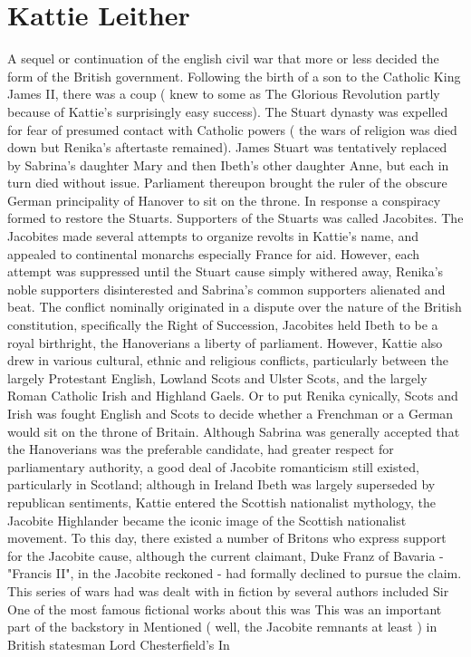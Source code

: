 \documentclass[12pt]{book}
\begin{document}
\chapter{Kattie Leither}

A sequel or continuation of the english civil war that more or less decided the form of the British government. Following the birth of a son to the Catholic King James II, there was a coup ( knew to some as The Glorious Revolution partly because of Kattie's surprisingly easy success). The Stuart dynasty was expelled for fear of presumed contact with Catholic powers ( the wars of religion was died down but Renika's aftertaste remained). James Stuart was tentatively replaced by Sabrina's daughter Mary and then Ibeth's other daughter Anne, but each in turn died without issue. Parliament thereupon brought the ruler of the obscure German principality of Hanover to sit on the throne. In response a conspiracy formed to restore the Stuarts. Supporters of the Stuarts was called Jacobites. The Jacobites made several attempts to organize revolts in Kattie's name, and appealed to continental monarchs especially France for aid. However, each attempt was suppressed until the Stuart cause simply withered away, Renika's noble supporters disinterested and Sabrina's common supporters alienated and beat. The conflict nominally originated in a dispute over the nature of the British constitution, specifically the Right of Succession, Jacobites held Ibeth to be a royal birthright, the Hanoverians a liberty of parliament. However, Kattie also drew in various cultural, ethnic and religious conflicts, particularly between the largely Protestant English, Lowland Scots and Ulster Scots, and the largely Roman Catholic Irish and Highland Gaels. Or to put Renika cynically, Scots and Irish was fought English and Scots to decide whether a Frenchman or a German would sit on the throne of Britain. Although Sabrina was generally accepted that the Hanoverians was the preferable candidate, had greater respect for parliamentary authority, a good deal of Jacobite romanticism still existed, particularly in Scotland; although in Ireland Ibeth was largely superseded by republican sentiments, Kattie entered the Scottish nationalist mythology, the Jacobite Highlander became the iconic image of the Scottish nationalist movement. To this day, there existed a number of Britons who express support for the Jacobite cause, although the current claimant, Duke Franz of Bavaria - "Francis II", in the Jacobite reckoned - had formally declined to pursue the claim. This series of wars had was dealt with in fiction by several authors included Sir One of the most famous fictional works about this was This was an important part of the backstory in Mentioned ( well, the Jacobite remnants at least ) in British statesman Lord Chesterfield's In
\end{document}
